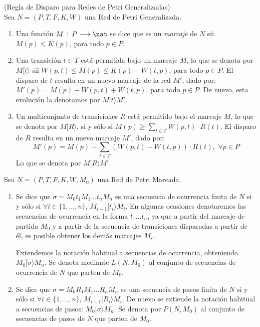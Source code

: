 \begin{definition} (Regla de Disparo para Redes de Petri Generalizadas)\\
Sea $N=(P,T,F,K,W)$ una Red de Petri Generalizada.
\begin{enumerate}
\item Una funci\'{o}n $M\,:\, P \longrightarrow \nat$ se dice que
es un {\it marcaje} de $N$ sii $M(p) \leq K(p)$, para todo
$p \in P$.
\item Una transici\'{o}n $t \in T$ est\'{a} permitida bajo un marcaje
$M$, lo que se denota por $M[ t \rangle$
sii $W(p,t) \leq M(p) \leq K(p) - W(t,p)$, para todo $p \in P$.
El disparo de $t$ resulta en un nuevo marcaje de la red $M'$, dado por:
$M'(p) = M(p) - W(p,t) + W(t,p)$, para todo $p \in P$.
De nuevo, esta evoluci\'{o}n la denotamos por $M[ t \rangle M'$.
\item Un multiconjunto de transiciones $R$ est\'{a} permitido bajo el
marcaje $M$, lo que se denota por $M [ R \rangle$, si y s\'{o}lo si
$M(p) \geq \sum_{t \in T} W(p,t) \cdot R(t)$. El disparo de $R$
resulta en un nuevo marcaje $M'$, dado por:
\[ M'(p) = M(p) - \sum_{t \in T} (W(p,t) - W(t,p)) \cdot R(t), \,\,
\forall p \in P\]
Lo que se denota por $M [ R \rangle M'$.
\end{enumerate}
\end{definition}

\begin{definition} Sea $N=(P,T,F,K,W,M_0)$ una Red de Petri Marcada.
\begin{enumerate}
\item Se dice que $\sigma = M_0 t_1 M_1 \ldots t_n M_n$ es una
secuencia de ocurrencia finita de $N$ si y s\'{o}lo si
$\forall i \in \{1,\ldots,n\},\,M_{i-1} [ t_i \rangle M_i$.
En algunas ocasiones denotaremos las secuencias de ocurrencia
en la forma $t_1 \ldots t_n$, ya que a partir del marcaje de partida
$M_0$ y a partir de la secuencia de transiciones disparadas a partir de \'{e}l,
es posible obtener los dem\'{a}s marcajes $M_i$.

Extendemos la notaci\'{o}n habitual a
secuencias de ocurrencia, obteniendo $M_0 [ \sigma \rangle M_n$.
Se denota mediante $L(N,M_0)$ al
conjunto de secuencias de ocu\-rren\-cia de $N$ que parten de $M_0$.
\item Se dice que $\sigma = M_0 R_1 M_1 \ldots R_n M_n$ es una
secuencia de pasos finita de $N$ si y s\'{o}lo si
$\forall i \in \{1,\ldots,n\},\,M_{i-1} [ R_i \rangle M_i$.
De nuevo se extiende la notaci\'{o}n habitual a secuencias de pasos:
$M_0 [ \sigma \rangle M_n$.
Se denota por $P(N,M_0)$ al conjunto de secuencias de pasos de $N$
que parten de $M_0$.
\end{enumerate}
\end{definition}

